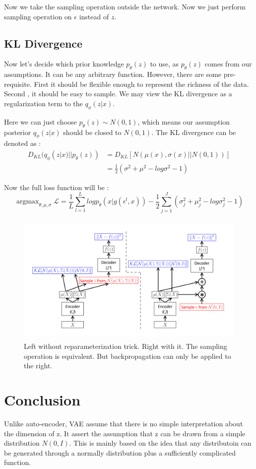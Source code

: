 \documentclass{article}
\begin{document}
Now we take the sampling operation outside the network. Now we just perform sampling operation on $\epsilon$ instead of $z$.

\subsection{KL Divergence}
Now let's decide which prior knowledge $p_{\theta}(z)$ to use, as $p_{\theta}(z)$ comes from our assumptions. It can be any arbitrary function. However, there are some pre-requisite. First it should be flexible enough to represent the richness of the data. Second , it should be easy to sample. We may view the KL divergence as a regularization term to the $q_{\phi}(z|x)$.

Here we can just choose $p_{\theta}(z) \sim N(0,1)$, which means our assumption posterior $q_{\phi}(z|x)$ should be closed to $N(0,1)$. The KL divergence can be  denoted as :
\begin{align*}
D_{KL}(q_{\phi}(z|x)||p_{\theta}(z)) &=D_{KL}[N(\mu(x),\sigma(x)||N(0,1))] \\
&= \frac{1}{2}(\sigma^{2}+\mu^{2}-log\sigma^{2}-1)
\end{align*}

Now the full loss function will be :
$$\mathop{\arg\max}_{\theta,\mu,\sigma}\mathcal{L} =\frac{1}{L}\sum_{l=1}^{L}logp_{\theta}(x|g(\epsilon^{l},x)) -\frac{1}{2}\sum_{j=1}^{J}(\sigma_{j}^{2}+\mu_{j}^{2}-log\sigma_{j}^{2}-1)$$

\begin{figure}[H]
\centering
\includegraphics[width=5in,height=2.5in]{graph3}
\caption{Left without reparameterization trick. Right with it. The sampling operation is equivalent. But backpropagation can only be applied
to the right.\cite{DBLP:journals/corr/Doersch16}}
\end{figure}
 


\section{Conclusion}
Unlike auto-encoder, VAE assume that there is no simple interpretation about the dimension of z. It assert the assumption that z can be drawn from a simple distribution $N(0,I)$. This is mainly based on the idea that any distributoin can be generated through a normally distribution plus a sufficiently complicated function.
\end{document}

